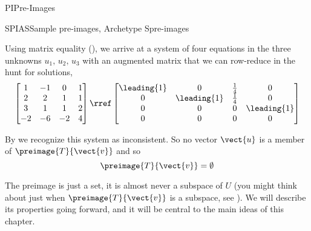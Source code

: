 \begin{subsect}{PI}{Pre-Images}
\begin{example}{SPIAS}{Sample pre-images, Archetype S}{pre-images}
\begin{para}
\end{para}
%
\begin{para}Using matrix equality (), we arrive at a system of four equations in the three unknowns $u_1,\,u_2,\,u_3$ with an augmented matrix that we can row-reduce in the hunt for solutions,
%
\begin{equation*}
\begin{bmatrix}
1 & -1 & 0 & 1\\
2 & 2 & 1 & 1\\
3 & 1 & 1 & 2\\
-2 & -6 & -2 & 4
\end{bmatrix}
\rref
\begin{bmatrix}
\leading{1} & 0 & \frac{1}{4} &  0\\
0 & \leading{1} & \frac{1}{4} &  0\\
0 & 0 & 0 &  \leading{1}\\
0 & 0 & 0 &  0
\end{bmatrix}
\end{equation*}
\end{para}
%
\begin{para}By  we recognize this system as inconsistent.  So no vector $\vect{u}$ is a member of $\preimage{T}{\vect{v}}$ and so
%
\begin{equation*}
\preimage{T}{\vect{v}}=\emptyset
\end{equation*}
\end{para}
%
\end{example}
%
\begin{para}The preimage is just a set, it is almost never a subspace of $U$ (you might think about just when $\preimage{T}{\vect{v}}$ is a subspace, see ).  We will describe its properties going forward, and it will be central to the main ideas of this chapter.\end{para}
%
%
\end{subsect}
%
